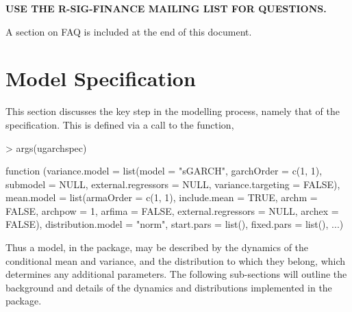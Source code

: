 \textbf{USE THE R-SIG-FINANCE MAILING LIST FOR QUESTIONS.}

A section on FAQ is included at the end of this document.
\section{Model Specification}
This section discusses the key step in the modelling process, namely that of the
specification. This is defined via a call to the \verb@ugarchspec@ function,
\begin{Schunk}
\begin{Sinput}
> args(ugarchspec)
\end{Sinput}
\begin{Soutput}
function (variance.model = list(model = "sGARCH", garchOrder = c(1,
    1), submodel = NULL, external.regressors = NULL, variance.targeting = FALSE),
    mean.model = list(armaOrder = c(1, 1), include.mean = TRUE,
        archm = FALSE, archpow = 1, arfima = FALSE, external.regressors = NULL,
        archex = FALSE), distribution.model = "norm", start.pars = list(),
    fixed.pars = list(), ...)
\end{Soutput}
\end{Schunk}
Thus a model, in the \verb@rugarch@ package, may be described by the dynamics of
the conditional mean and variance, and the distribution to which they belong,
which determines any additional parameters. The following sub-sections will
outline the background and details of the dynamics and distributions implemented
in the package.

